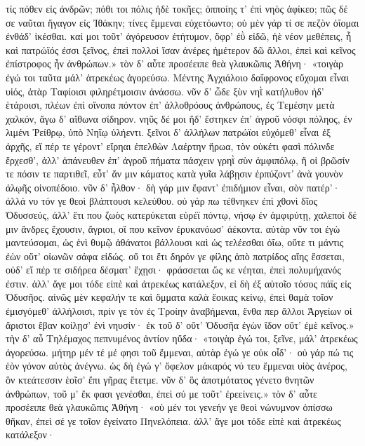 τίς πόθεν εἰς ἀνδρῶν; πόθι τοι πόλις ἠδὲ τοκῆες;    
ὁπποίης τ' ἐπὶ νηὸς ἀφίκεο; πῶς δέ σε ναῦται
ἤγαγον εἰς Ἰθάκην; τίνες ἔμμεναι εὐχετόωντο;
οὐ μὲν γάρ τί σε πεζὸν ὀΐομαι ἐνθάδ' ἱκέσθαι.
καί μοι τοῦτ' ἀγόρευσον ἐτήτυμον, ὄφρ' ἐῢ εἰδῶ,
ἠὲ νέον μεθέπεις, ἦ καὶ πατρώϊός ἐσσι
ξεῖνος, ἐπεὶ πολλοὶ ἴσαν ἀνέρες ἡμέτερον δῶ
ἄλλοι, ἐπεὶ καὶ κεῖνος ἐπίστροφος ἦν ἀνθρώπων.»
\nstanza
τὸν δ' αὖτε προσέειπε θεὰ γλαυκῶπις Ἀθήνη·
«τοιγὰρ ἐγώ τοι ταῦτα μάλ' ἀτρεκέως ἀγορεύσω.
Μέντης Ἀγχιάλοιο δαΐφρονος εὔχομαι εἶναι    
υἱός, ἀτὰρ Ταφίοισι φιληρέτμοισιν ἀνάσσω.
νῦν δ' ὧδε ξὺν νηῒ κατήλυθον ἠδ' ἑτάροισι,
πλέων ἐπὶ οἴνοπα πόντον ἐπ' ἀλλοθρόους ἀνθρώπους,
ἐς Τεμέσην μετὰ χαλκόν, ἄγω δ' αἴθωνα σίδηρον.
νηῦς δέ μοι ἥδ' ἕστηκεν ἐπ' ἀγροῦ νόσφι πόληος,
ἐν λιμένι Ῥείθρῳ, ὑπὸ Νηΐῳ ὑλήεντι.
ξεῖνοι δ' ἀλλήλων πατρώϊοι εὐχόμεθ' εἶναι
ἐξ ἀρχῆς, εἴ πέρ τε γέροντ' εἴρηαι ἐπελθὼν
Λαέρτην ἥρωα, τὸν οὐκέτι φασὶ πόλινδε
ἔρχεσθ', ἀλλ' ἀπάνευθεν ἐπ' ἀγροῦ πήματα πάσχειν    
γρηῒ σὺν ἀμφιπόλῳ, ἥ οἱ βρῶσίν τε πόσιν τε
παρτιθεῖ, εὖτ' ἄν μιν κάματος κατὰ γυῖα λάβῃσιν
ἑρπύζοντ' ἀνὰ γουνὸν ἀλῳῆς οἰνοπέδοιο.
νῦν δ' ἦλθον· δὴ γάρ μιν ἔφαντ' ἐπιδήμιον εἶναι,
σὸν πατέρ'· ἀλλά νυ τόν γε θεοὶ βλάπτουσι κελεύθου.
οὐ γάρ πω τέθνηκεν ἐπὶ χθονὶ δῖος Ὀδυσσεύς,
ἀλλ' ἔτι που ζωὸς κατερύκεται εὐρέϊ πόντῳ,
νήσῳ ἐν ἀμφιρύτῃ, χαλεποὶ δέ μιν ἄνδρες ἔχουσιν,
ἄγριοι, οἵ που κεῖνον ἐρυκανόωσ' ἀέκοντα.
αὐτὰρ νῦν τοι ἐγὼ μαντεύσομαι, ὡς ἐνὶ θυμῷ    
ἀθάνατοι βάλλουσι καὶ ὡς τελέεσθαι ὀΐω,
οὔτε τι μάντις ἐὼν οὔτ' οἰωνῶν σάφα εἰδώς.
οὔ τοι ἔτι δηρόν γε φίλης ἀπὸ πατρίδος αἴης
ἔσσεται, οὐδ' εἴ πέρ τε σιδήρεα δέσματ' ἔχῃσι·
φράσσεται ὥς κε νέηται, ἐπεὶ πολυμήχανός ἐστιν.
ἀλλ' ἄγε μοι τόδε εἰπὲ καὶ ἀτρεκέως κατάλεξον,
εἰ δὴ ἐξ αὐτοῖο τόσος πάϊς εἰς Ὀδυσῆος.
αἰνῶς μὲν κεφαλήν τε καὶ ὄμματα καλὰ ἔοικας
κείνῳ, ἐπεὶ θαμὰ τοῖον ἐμισγόμεθ' ἀλλήλοισι,
πρίν γε τὸν ἐς Τροίην ἀναβήμεναι, ἔνθα περ ἄλλοι    
Ἀργείων οἱ ἄριστοι ἔβαν κοίλῃσ' ἐνὶ νηυσίν·
ἐκ τοῦ δ' οὔτ' Ὀδυσῆα ἐγὼν ἴδον οὔτ' ἐμὲ κεῖνος.»
\nstanza
τὴν δ' αὖ Τηλέμαχος πεπνυμένος ἀντίον ηὔδα·
«τοιγὰρ ἐγώ τοι, ξεῖνε, μάλ' ἀτρεκέως ἀγορεύσω.
μήτηρ μέν τέ μέ φησι τοῦ ἔμμεναι, αὐτὰρ ἐγώ γε
οὐκ οἶδ'· οὐ γάρ πώ τις ἑὸν γόνον αὐτὸς ἀνέγνω.
ὡς δὴ ἐγώ γ' ὄφελον μάκαρός νύ τευ ἔμμεναι υἱὸς
ἀνέρος, ὃν κτεάτεσσιν ἑοῖσ' ἔπι γῆρας ἔτετμε.
νῦν δ' ὃς ἀποτμότατος γένετο θνητῶν ἀνθρώπων,
τοῦ μ' ἔκ φασι γενέσθαι, ἐπεὶ σύ με τοῦτ' ἐρεείνεις.»    
\nstanza
τὸν δ' αὖτε προσέειπε θεὰ γλαυκῶπις Ἀθήνη·
«οὐ μέν τοι γενεήν γε θεοὶ νώνυμνον ὀπίσσω
θῆκαν, ἐπεὶ σέ γε τοῖον ἐγείνατο Πηνελόπεια.
ἀλλ' ἄγε μοι τόδε εἰπὲ καὶ ἀτρεκέως κατάλεξον·
